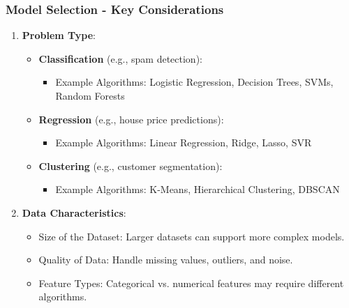 \documentclass[aspectratio=169]{beamer}
\begin{document}
\begin{frame}[fragile]
    \frametitle{Model Selection - Key Considerations}
    \begin{enumerate}
        \item \textbf{Problem Type}:
            \begin{itemize}
                \item \textbf{Classification} (e.g., spam detection): 
                    \begin{itemize}
                        \item Example Algorithms: Logistic Regression, Decision Trees, SVMs, Random Forests
                    \end{itemize}
                \item \textbf{Regression} (e.g., house price predictions): 
                    \begin{itemize}
                        \item Example Algorithms: Linear Regression, Ridge, Lasso, SVR
                    \end{itemize}
                \item \textbf{Clustering} (e.g., customer segmentation): 
                    \begin{itemize}
                        \item Example Algorithms: K-Means, Hierarchical Clustering, DBSCAN
                    \end{itemize}
            \end{itemize}
        \item \textbf{Data Characteristics}:
            \begin{itemize}
                \item Size of the Dataset: Larger datasets can support more complex models.
                \item Quality of Data: Handle missing values, outliers, and noise.
                \item Feature Types: Categorical vs. numerical features may require different algorithms.
            \end{itemize}
    \end{enumerate}
\end{frame}
\end{document}
